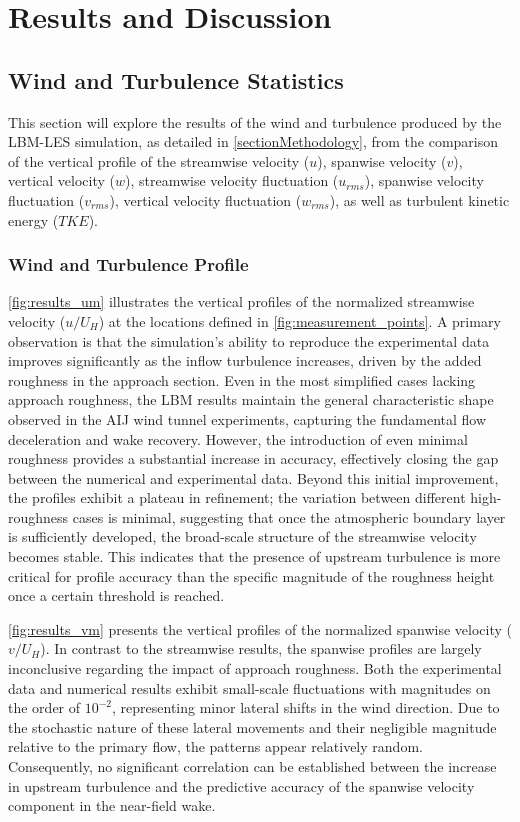 \section{Results and Discussion}
\subsection{Wind and Turbulence Statistics}
This section will explore the results of the wind and turbulence produced by the LBM-LES simulation, as detailed in \autoref{sectionMethodology}, from the comparison of the vertical profile of the streamwise velocity ($u$), spanwise velocity ($v$), vertical velocity ($w$), streamwise velocity fluctuation ($u_{rms}$), spanwise velocity fluctuation ($v_{rms}$), vertical velocity fluctuation ($w_{rms}$), as well as turbulent kinetic energy ($TKE$).

\subsubsection{Wind and Turbulence Profile}

\autoref{fig:results_um} illustrates the vertical profiles of the normalized streamwise velocity ($u/U_H$) at the locations defined in \autoref{fig:measurement_points}. A primary observation is that the simulation's ability to reproduce the experimental data improves significantly as the inflow turbulence increases, driven by the added roughness in the approach section. Even in the most simplified cases lacking approach roughness, the LBM results maintain the general characteristic shape observed in the AIJ wind tunnel experiments, capturing the fundamental flow deceleration and wake recovery. However, the introduction of even minimal roughness provides a substantial increase in accuracy, effectively closing the gap between the numerical and experimental data. Beyond this initial improvement, the profiles exhibit a plateau in refinement; the variation between different high-roughness cases is minimal, suggesting that once the atmospheric boundary layer is sufficiently developed, the broad-scale structure of the streamwise velocity becomes stable. This indicates that the presence of upstream turbulence is more critical for profile accuracy than the specific magnitude of the roughness height once a certain threshold is reached.

\autoref{fig:results_vm} presents the vertical profiles of the normalized spanwise velocity ($v/U_H$). In contrast to the streamwise results, the spanwise profiles are largely inconclusive regarding the impact of approach roughness. Both the experimental data and numerical results exhibit small-scale fluctuations with magnitudes on the order of $10^{-2}$, representing minor lateral shifts in the wind direction. Due to the stochastic nature of these lateral movements and their negligible magnitude relative to the primary flow, the patterns appear relatively random. Consequently, no significant correlation can be established between the increase in upstream turbulence and the predictive accuracy of the spanwise velocity component in the near-field wake.

